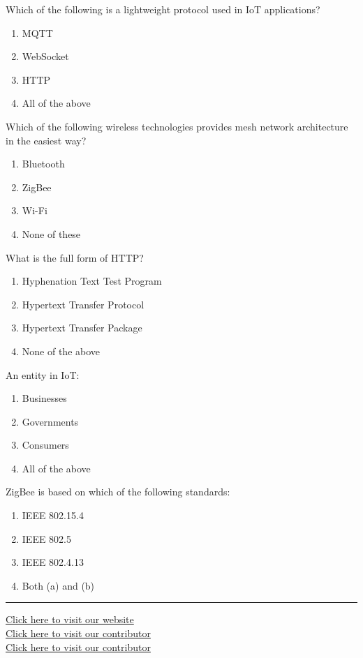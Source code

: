 \documentclass[11pt,a4paper]{article}
\begin{document}
\begin{parts}
  \item Which of the following is a lightweight protocol used in IoT applications?
  
\begin{enumerate}[label=(\alph*)]
    \item MQTT
    \item WebSocket
    \item HTTP
    \item All of the above
  \end{enumerate}
  
  \item Which of the following wireless technologies provides mesh network architecture in the easiest way?
  
\begin{enumerate}[label=(\alph*)]
    \item Bluetooth
    \item ZigBee
    \item Wi-Fi
    \item None of these
  \end{enumerate}
  
  \item What is the full form of HTTP?
  
\begin{enumerate}[label=(\alph*)]
    \item Hyphenation Text Test Program
    \item Hypertext Transfer Protocol
    \item Hypertext Transfer Package
    \item None of the above
  \end{enumerate}
  
  \item An entity in IoT:
  
\begin{enumerate}[label=(\alph*)]
    \item Businesses
    \item Governments
    \item Consumers
    \item All of the above
  \end{enumerate}
  
  \item ZigBee is based on which of the following standards:
  
\begin{enumerate}[label=(\alph*)]
    \item IEEE 802.15.4
    \item IEEE 802.5
    \item IEEE 802.4.13
    \item Both (a) and (b)
  \end{enumerate}
\end{parts}

\vfill
\rule{\linewidth}{0.4pt}

\begin{center}\small
\href{https://bhu-exam.vercel.app/}{Click here to visit our website}\\[4pt]\href{https://me-aryan.vercel.app/}{Click here to visit our contributor}\\[4pt]\href{https://quashan-me.vercel.app/}{Click here to visit our contributor}
\end{center}
\end{document}
